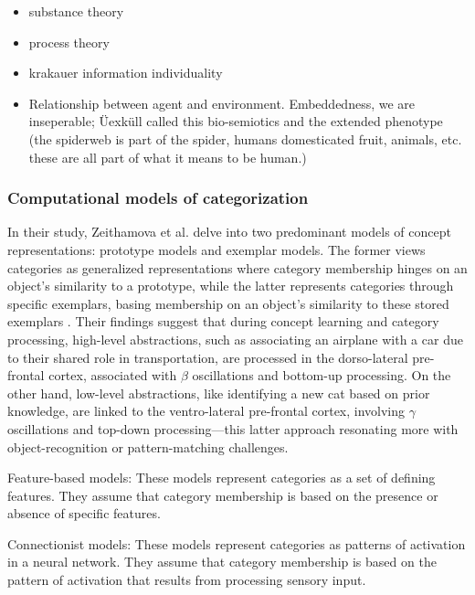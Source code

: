 \begin{itemize}
    \item substance theory
    \item process theory
    \item krakauer information individuality
    \item Relationship between agent and environment. Embeddedness, we are inseperable; Üexküll called this bio-semiotics and the extended phenotype (the spiderweb is part of the spider, humans domesticated fruit, animals, etc. these are all part of what it means to be human.)
\end{itemize}






\subsubsection{Computational models of categorization}

In their study, Zeithamova et al. delve into two predominant models of concept representations: \gls{prototype models} and \gls{exemplar models}. The former views categories as generalized representations where category membership hinges on an object's similarity to a prototype, while the latter represents categories through specific exemplars, basing membership on an object's similarity to these stored exemplars \cite{zeithamova_brain_2019}. Their findings suggest that during concept learning and category processing, high-level abstractions, such as associating an airplane with a car due to their shared role in transportation, are processed in the dorso-lateral pre-frontal cortex, associated with $\beta$ oscillations and bottom-up processing. On the other hand, low-level abstractions, like identifying a new cat based on prior knowledge, are linked to the ventro-lateral pre-frontal cortex, involving $\gamma$ oscillations and top-down processing—this latter approach resonating more with object-recognition or pattern-matching challenges.


Feature-based models: These models represent categories as a set of defining features. They assume that category membership is based on the presence or absence of specific features.

Connectionist models: These models represent categories as patterns of activation in a neural network. They assume that category membership is based on the pattern of activation that results from processing sensory input.

